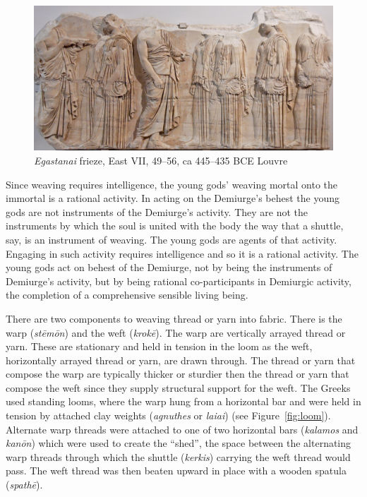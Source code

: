 \begin{figure}[htbp]
     \centering
         \includegraphics[scale=1.4]{graphics/egastinai_frieze.jpg}
     \caption{\emph{Egastanai} frieze, East VII, 49--56, ca 445--435 BCE Louvre}
     \label{fig:frieze}
\end{figure}

Since weaving requires intelligence, the young gods' weaving mortal onto the immortal is a rational activity. In acting on the Demiurge's behest the young gods are not instruments of the Demiurge's activity. They are not the instruments by which the soul is united with the body the way that a shuttle, say, is an instrument of weaving. The young gods are agents of that activity. Engaging in such activity requires intelligence and so it is a rational activity. The young gods act on behest of the Demiurge, not by being the instruments of Demiurge's activity, but by being rational co-participants in Demiurgic activity, the completion of a comprehensive sensible living being. 

There are two components to weaving thread or yarn into fabric. There is the warp (\emph{stēmōn}) and the weft (\emph{krokē}). The warp are vertically arrayed thread or yarn. These are stationary and held in tension in the loom as the weft, horizontally arrayed thread or yarn, are drawn through. The thread or yarn that compose the warp are typically thicker or sturdier then the thread or yarn that compose the weft since they supply structural support for the weft. The Greeks used standing looms, where the warp hung from a horizontal bar and were held in tension by attached clay weights (\emph{agnuthes} or \emph{laiai}) (see Figure~\ref{fig:loom}). Alternate warp threads were attached to one of two horizontal bars (\emph{kalamos} and \emph{kanōn}) which were used to create the ``shed'', the space between the alternating warp threads through which the shuttle (\emph{kerkis}) carrying the weft thread would pass. The weft thread was then beaten upward in place with a wooden spatula (\emph{spathē}). 

